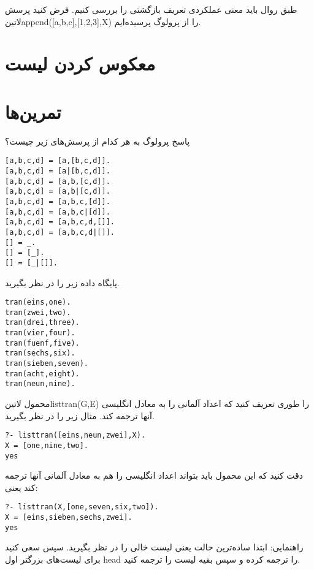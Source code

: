 طبق روال باید معنی عملکردی تعریف بازگشتی را بررسی کنیم. فرض کنید پرسش ‌لاتین{append([a,b,c],[1,2,3],X)} را از پرولوگ پرسیده‌ایم. 
\section{معکوس کردن لیست}


\clearpage

\section{تمرین‌ها}

\begin{exercise}
پاسخ پرولوگ به هر کدام از پرسش‌های زیر چیست؟

\begin{latin}
\begin{lstlisting}
[a,b,c,d] = [a,[b,c,d]].
[a,b,c,d] = [a|[b,c,d]].
[a,b,c,d] = [a,b,[c,d]].
[a,b,c,d] = [a,b|[c,d]].
[a,b,c,d] = [a,b,c,[d]].
[a,b,c,d] = [a,b,c|[d]].
[a,b,c,d] = [a,b,c,d,[]].
[a,b,c,d] = [a,b,c,d|[]].
[] = _.
[] = [_].
[] = [_|[]].
\end{lstlisting}
\end{latin}

\end{exercise}

\begin{exercise}
پایگاه داده زیر را در نظر بگیرید.

\begin{latin}
\begin{lstlisting}
tran(eins,one).
tran(zwei,two).
tran(drei,three).
tran(vier,four).
tran(fuenf,five).
tran(sechs,six).
tran(sieben,seven).
tran(acht,eight).
tran(neun,nine).
\end{lstlisting}
\end{latin}

محمول ‌لاتین{listtran(G,E)} را طوری تعریف کنید که اعداد آلمانی را به معادل انگلیسی آنها ترجمه کند. مثال زیر را در نظر بگیرید.

\begin{latin}
\begin{lstlisting}
?- listtran([eins,neun,zwei],X).
X = [one,nine,two].
yes
\end{lstlisting}
\end{latin}

دقت کنید که این محمول باید بتواند اعداد انگلیسی را هم به معادل آلمانی آنها ترجمه کند یعنی:

\begin{latin}
\begin{lstlisting}
?- listtran(X,[one,seven,six,two]).
X = [eins,sieben,sechs,zwei].
yes
\end{lstlisting}
\end{latin}

راهنمایی: ابتدا ساده‌ترین حالت یعنی لیست خالی را در نظر بگیرید. سپس سعی کنید برای لیست‌های بزرگتر اول head را ترجمه کرده و سپس بقیه لیست را ترجمه کنید.
\end{exercise}


